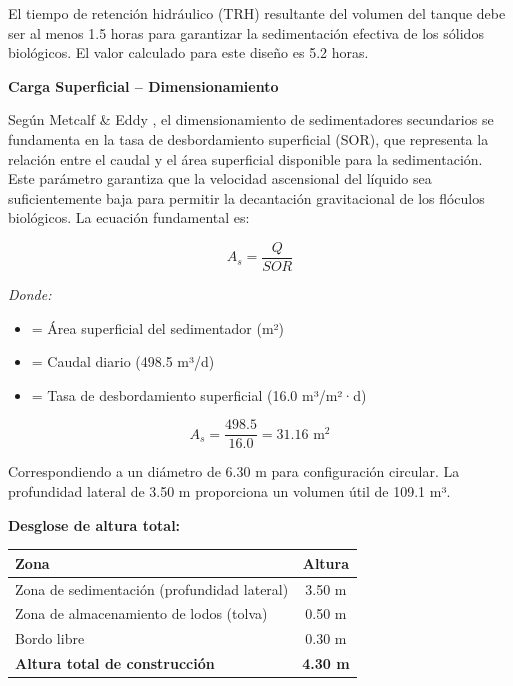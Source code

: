 \documentclass[12pt,a4paper]{article}
\begin{document}
El tiempo de retención hidráulico (TRH) resultante del volumen del tanque debe ser al menos 1.5 horas para garantizar la sedimentación efectiva de los sólidos biológicos. El valor calculado para este diseño es 5.2 horas.

\textbf{Carga Superficial -- Dimensionamiento}

Según Metcalf \& Eddy \cite{metcalf2014}, el dimensionamiento de sedimentadores secundarios se fundamenta en la tasa de desbordamiento superficial (SOR), que representa la relación entre el caudal y el área superficial disponible para la sedimentación. Este parámetro garantiza que la velocidad ascensional del líquido sea suficientemente baja para permitir la decantación gravitacional de los flóculos biológicos. La ecuación fundamental es:

\begin{equation}
A_s = \frac{Q}{SOR}
\end{equation}

\textit{Donde:}
\begin{itemize}[noitemsep,leftmargin=2em]
    \item[$A_s$] = Área superficial del sedimentador (m²)
    \item[$Q$] = Caudal diario (498.5 m³/d)
    \item[$SOR$] = Tasa de desbordamiento superficial (16.0 m³/m²·d)
\end{itemize}

\begin{equation}
A_s = \frac{498.5}{16.0} = 31.16 \text{ m}^2
\end{equation}

Correspondiendo a un diámetro de 6.30 m para configuración circular. La profundidad lateral de 3.50 m proporciona un volumen útil de 109.1 m³.

\textbf{Desglose de altura total:}

\begin{table}[H]
\centering
\small
\begin{tabular}{lc}
\toprule
Zona & Altura \\
\midrule
Zona de sedimentación (profundidad lateral) & 3.50 m \\
Zona de almacenamiento de lodos (tolva) & 0.50 m \\
Bordo libre & 0.30 m \\
\midrule
\textbf{Altura total de construcción} & \textbf{4.30 m} \\
\bottomrule
\end{tabular}
\end{table}
\end{document}
